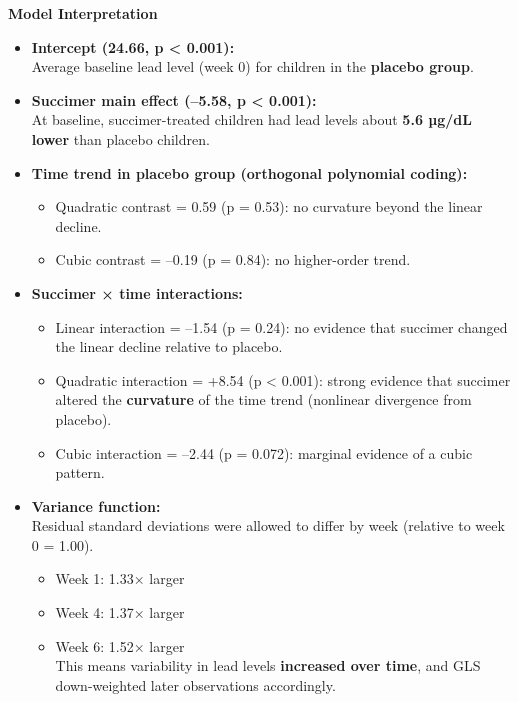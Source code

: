 \documentclass[
  letterpaper,
  DIV=11,
  numbers=noendperiod]{scrreprt}
\providecommand{\tightlist}{%
  \setlength{\itemsep}{0pt}\setlength{\parskip}{0pt}}\usepackage{longtable,booktabs,array}
\begin{document}
\textbf{Model Interpretation}

\begin{itemize}
\item
  \textbf{Intercept (24.66, p \textless{} 0.001):}\\
  Average baseline lead level (week 0) for children in the
  \textbf{placebo group}.
\item
  \textbf{Succimer main effect (--5.58, p \textless{} 0.001):}\\
  At baseline, succimer-treated children had lead levels about
  \textbf{5.6 µg/dL lower} than placebo children.
\item
  \textbf{Time trend in placebo group (orthogonal polynomial coding):}

  \begin{itemize}
  \tightlist
  \item
    Quadratic contrast = 0.59 (p = 0.53): no curvature beyond the linear
    decline.\\
  \item
    Cubic contrast = --0.19 (p = 0.84): no higher-order trend.
  \end{itemize}
\item
  \textbf{Succimer × time interactions:}

  \begin{itemize}
  \tightlist
  \item
    Linear interaction = --1.54 (p = 0.24): no evidence that succimer
    changed the linear decline relative to placebo.\\
  \item
    Quadratic interaction = +8.54 (p \textless{} 0.001): strong evidence
    that succimer altered the \textbf{curvature} of the time trend
    (nonlinear divergence from placebo).\\
  \item
    Cubic interaction = --2.44 (p = 0.072): marginal evidence of a cubic
    pattern.
  \end{itemize}
\item
  \textbf{Variance function:}\\
  Residual standard deviations were allowed to differ by week (relative
  to week 0 = 1.00).

  \begin{itemize}
  \tightlist
  \item
    Week 1: 1.33× larger\\
  \item
    Week 4: 1.37× larger\\
  \item
    Week 6: 1.52× larger\\
    This means variability in lead levels \textbf{increased over time},
    and GLS down-weighted later observations accordingly.
  \end{itemize}
\end{itemize}
\end{document}
